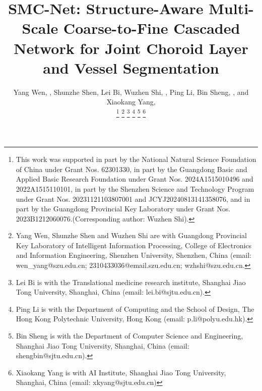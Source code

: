 \documentclass[lettersize,journal]{IEEEtran}
\begin{document}
\title{SMC-Net: Structure-Aware Multi-Scale Coarse-to-Fine Cascaded Network for Joint Choroid Layer and Vessel Segmentation}

\author{Yang Wen, , Shunzhe Shen, Lei Bi, Wuzhen Shi, , Ping Li, Bin Sheng, , and Xiaokang Yang, 

\thanks{This work was supported in part by the National Natural Science Foundation of China under Grant Nos. 62301330, in part by the Guangdong Basic and Applied Basic Research Foundation under Grant Nos. 2024A1515010496 and 2022A1515110101, in part by the Shenzhen Science and Technology Program under Grant Nos. 20231121103807001 and JCYJ20240813141358076, and in part by the Guangdong Provincial Key Laboratory under Grant Nos. 2023B1212060076.(Corresponding author: Wuzhen Shi).}
\thanks{Yang Wen, Shunzhe Shen and Wuzhen Shi are with Guangdong Provincial Key Laboratory of Intelligent Information Processing, College of Electronics and Information Engineering, Shenzhen University, Shenzhen, China (email: wen\_yang@szu.edu.cn; 2310433036@email.szu.edu.cn; wzhshi@szu.edu.cn.}
\thanks{Lei Bi is with the Translational medicine research institute, Shanghai Jiao Tong University, Shanghai, China (email: lei.bi@sjtu.edu.cn).}
\thanks{Ping Li is with the Department of Computing and the School of Design, The Hong Kong Polytechnic University, Hong Kong (email: p.li@polyu.edu.hk).}
\thanks{Bin Sheng is with the Department of Computer Science and Engineering, Shanghai Jiao Tong University, Shanghai, China (email: shengbin@sjtu.edu.cn).}
\thanks{Xiaokang Yang is with AI Institute, Shanghai Jiao
Tong University, Shanghai, China (email: xkyang@sjtu.edu.cn)}
}
         
\end{document}
